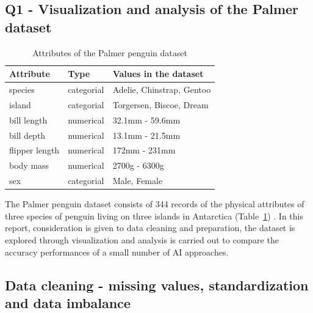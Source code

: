 \documentclass[12pt]{article}
\begin{document}
\begin{center}
\subsection*{Q1 - Visualization and analysis of the Palmer dataset}
\end{center}

\begin{table} %
  \small
  \begin{center}
  \vspace{-1.5\baselineskip} %
  \setlength{\abovecaptionskip}{5pt}
  \setlength{\belowcaptionskip}{5pt}
  \fontsize{10}{10}\selectfont %
  \begin{tabular}{l|l|l}
  Attribute&Type&Values in the dataset\\
  \hline
  species&categorial&Adelie, Chinstrap, Gentoo\\
  island&categorial&Torgersen, Biscoe, Dream\\
  bill length&numerical&32.1mm - 59.6mm\\
  bill depth&numerical&13.1mm - 21.5mm\\
  flipper length&numerical&172mm - 231mm\\
  body mass&numerical&2700g - 6300g\\
  sex&categorial&Male, Female
  \end{tabular}
  \vspace{-1.5\baselineskip} %
  \end{center} 
  \caption{Attributes of the Palmer penguin dataset}
  \vspace{-1\baselineskip} %
  \label{tab:dataset}
\end{table} 

\noindent
The Palmer penguin dataset consists of 344 records of the physical attributes of three species of penguin 
living on three islands in Antarctica (Table~\ref{tab:dataset}) \cite{PM}. 
In this report, consideration is given to data cleaning and preparation, 
the dataset is explored through visualization and analysis is carried out 
to compare the accuracy performances of a small number of AI approaches. 

\vspace{\baselineskip}
\subsection*{Data cleaning - missing values, standardization and data imbalance}
\end{document}
